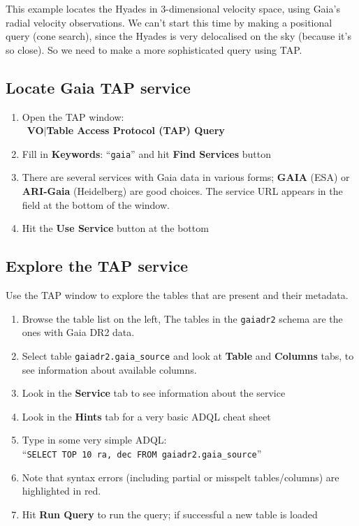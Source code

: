 \documentclass{article}
\newcommand{\buttimg}[1] %
           {\mbox{\vtop{\vskip-2ex\hbox{\includegraphics[height=3ex]
                                                        {icons/#1}}}}}
\newcommand{\lab}[1]{{\bf #1}}
\newcommand{\mb}[3]{\buttimg{#1}~\lab{#2}$\mid$\lab{#3}}
\newcommand{\entry}[2]{\lab{#1}: ``{\tt #2}''}
\begin{document}
This example locates the Hyades in 3-dimensional velocity space,
using Gaia's radial velocity observations.
We can't start this time by making a positional query (cone search),
since the Hyades is very delocalised on the sky (because it's so close).
So we need to make a more sophisticated query using TAP.

\subsection{Locate Gaia TAP service}

\begin{minipage}[t]{11cm}
  \raggedright

  \begin{enumerate}
  \item Open the TAP window: \\
        \mb{tap_button.png}{VO}{Table Access Protocol (TAP) Query}
  \item Fill in \entry{Keywords}{gaia} and hit \lab{Find Services} button
  \item There are several services with Gaia data in various forms;
        \lab{GAIA} (ESA) or \lab{ARI-Gaia} (Heidelberg) are good choices.
        The service URL appears in the field at the bottom of the window.
  \item Hit the \lab{Use Service} button at the bottom
  \end{enumerate}

  \subsection{Explore the TAP service}

  Use the TAP window to explore the tables that are present and
  their metadata.
  \begin{enumerate}
  \item Browse the table list on the left,
        The tables in the {\tt gaiadr2} schema are the ones with Gaia DR2 data.
  \item Select table {\tt gaiadr2.gaia\_source} and look at
        \lab{Table} and \lab{Columns} tabs,
        to see information about available columns.
  \item Look in the \lab{Service} tab to see information about the service
  \item Look in the \lab{Hints} tab for a very basic ADQL cheat sheet
  \item Type in some very simple ADQL:\\
        ``{\tt SELECT TOP 10 ra, dec FROM gaiadr2.gaia\_source}''
  \item Note that syntax errors (including partial or misspelt tables/columns)
        are highlighted in red.
  \item Hit \lab{Run Query} to run the query;
        if successful a new table is loaded
  \end{enumerate}


\end{minipage}
\end{document}
